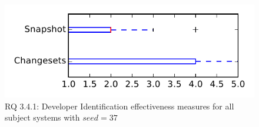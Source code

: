 
\begin{figure}
\centering
\includegraphics[height=0.4\textheight]{figures/dit_seed/rq1_tiny_37}
\caption{RQ 3.4.1: Developer Identification effectiveness measures for all subject systems with $seed=37$}
\label{fig:dit_seed:rq1:tiny}
\end{figure}
